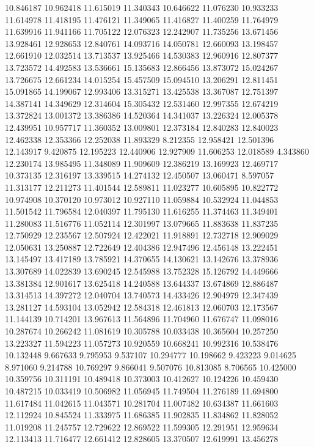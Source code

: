 10.846187
10.962418
11.615019
11.340343
10.646622
11.076230
10.933233
11.614978
11.418195
11.476121
11.349065
11.416827
11.400259
11.764979
11.639916
11.941166
11.705122
12.076323
12.242907
11.735256
13.671456
13.928461
12.928653
12.840761
14.093716
14.050781
12.660093
13.198457
12.661910
12.032514
13.713537
13.925466
14.530383
12.960916
12.807377
13.723572
14.492583
13.536661
15.135683
12.866456
13.873072
15.024267
13.726675
12.661234
14.015254
15.457509
15.094510
13.206291
12.811451
15.091865
14.199067
12.993406
13.315271
13.425538
13.367087
12.751397
14.387141
14.349629
12.314604
15.305432
12.531460
12.997355
12.674219
13.372824
13.001372
13.386386
14.520364
14.341037
13.226324
12.005378
12.439951
10.957717
11.360352
13.009801
12.373184
12.840283
12.840023
12.462338
12.353366
12.252038
11.893329
8.212355
12.958421
12.501396
12.143917
9.420875
12.195223
12.440906
12.927909
11.606253
12.018589
4.343860
12.230174
13.985495
11.348089
11.909609
12.386219
13.169923
12.469717
10.373135
12.316197
13.339515
14.274132
12.450507
13.060471
8.597057
11.313177
12.211273
11.401544
12.589811
11.023277
10.605895
10.822772
10.974908
10.370120
10.973012
10.927110
11.059884
10.532924
11.044853
11.501542
11.796584
12.040397
11.795130
11.616255
11.374463
11.349401
11.280083
11.516776
11.052114
12.301997
13.079665
11.883638
11.837235
12.750929
12.235567
12.507924
12.422021
11.918891
12.732718
12.909029
12.050631
13.250887
12.722649
12.404386
12.947496
12.456148
13.222451
13.145497
13.417189
13.785921
14.370655
14.130621
13.142676
13.378936
13.307689
14.022839
13.690245
12.545988
13.752328
15.126792
14.449666
13.381384
12.901617
13.625418
14.240588
13.644337
13.674869
12.886487
13.314513
14.397272
12.040704
13.740573
14.433426
12.904979
12.347439
13.281127
14.593104
13.052942
12.584318
12.461813
12.060703
12.173567
11.144139
10.714201
13.967613
11.564896
11.704960
11.676747
11.098016
10.287674
10.266242
11.081619
10.305788
10.033438
10.365604
10.257250
13.223327
11.594223
11.057273
10.920559
10.668241
10.992316
10.538476
10.132448
9.667633
9.795953
9.537107
10.294777
10.198662
9.423223
9.014625
8.971060
9.214788
10.769297
9.866041
9.507076
10.813085
8.706565
10.425000
10.359756
10.311191
10.489418
10.373003
10.412627
10.124226
10.459430
10.487215
10.033419
10.506982
11.056945
11.749504
11.276189
11.694800
11.617484
11.042615
11.043571
10.281704
11.007482
10.634387
11.661603
12.112924
10.845524
11.333975
11.686385
11.902835
11.834862
11.828052
11.019208
11.245757
12.729622
12.869522
11.599305
12.291951
12.959634
12.113413
11.716477
12.661412
12.828605
13.370507
12.619991
13.456278

